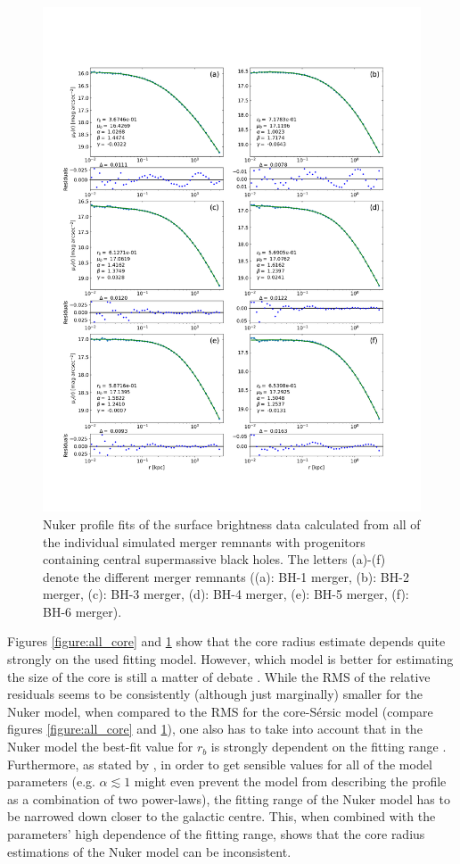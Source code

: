 \documentclass[english, oneside]{HYgradu}
\begin{document}
\begin{figure}
	\centering
	\includegraphics[width=\textwidth]{all_nuker_profiles.png}
	\caption{Nuker profile fits of the surface brightness data calculated from all of the individual simulated merger remnants with progenitors containing central supermassive black holes. The letters (a)-(f) denote the different merger remnants ((a): BH-1 merger, (b): BH-2 merger, (c): BH-3 merger, (d): BH-4 merger, (e): BH-5 merger, (f): BH-6 merger).}
	\label{figure:all_nuker}
\end{figure}

Figures \ref{figure:all_core} and \ref{figure:all_nuker} show that the core radius estimate depends quite strongly on the used fitting model. However, which model is better for estimating the size of the core is still a matter of debate \citep{Lauer2007, Dullo2012}. While the RMS of the relative residuals seems to be consistently (although just marginally) smaller for the Nuker model, when compared to the RMS for the core-Sérsic model (compare figures \ref{figure:all_core} and \ref{figure:all_nuker}), one also has to take into account that in the Nuker model the best-fit value for $r_b$ is strongly dependent on the fitting range \citep{Graham2003Nuker}. Furthermore, as stated by \cite{Rantala2018}, in order to get sensible values for all of the model parameters (e.g. $\alpha \lesssim 1$ might even prevent the model from describing the profile as a combination of two power-laws), the fitting range of the Nuker model has to be narrowed down closer to the galactic centre. This, when combined with the parameters' high dependence of the fitting range, shows that the core radius estimations of the Nuker model can be inconsistent.
\end{document}
